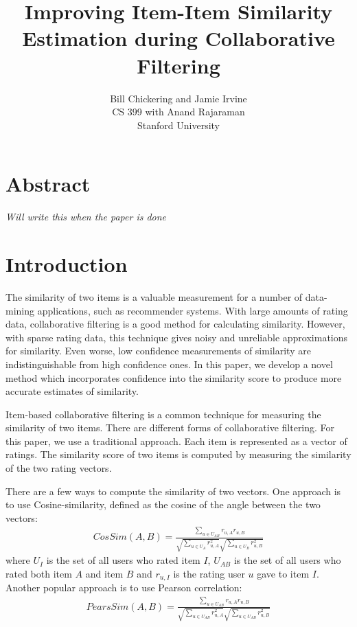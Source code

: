 \documentclass[11pt]{article}
\begin{document}

\title{Improving Item-Item Similarity Estimation during Collaborative Filtering}
\author{Bill Chickering and Jamie Irvine\\
CS 399 with Anand Rajaraman\\
Stanford University}
\renewcommand{\today}{March 25, 2014}
\maketitle

\section*{Abstract}
\emph{Will write this when the paper is done}

\section*{Introduction}
The similarity of two items is a valuable measurement for a number of
data-mining applications, such as recommender systems. With large amounts of
rating data, collaborative filtering is a good method for calculating
similarity. However, with sparse rating data, this technique gives noisy and
unreliable approximations for similarity. Even worse, low confidence
measurements of similarity are indistinguishable from high confidence ones. In
this paper, we develop a novel method which incorporates confidence into the
similarity score to produce more accurate estimates of similarity.
 
Item-based collaborative filtering is a common technique for measuring the
similarity of two items. There are different forms of collaborative filtering.
For this paper, we use a traditional approach. Each item is represented as a
vector of ratings. The similarity score of two items is computed by measuring
the similarity of the two rating vectors.

There are a few ways to compute the similarity of two vectors. One approach is
to use Cosine-similarity, defined as the cosine of the angle between the two
vectors:
\begin{align}
CosSim(A, B) = \frac{\sum\limits_{u\in U_{AB}}
r_{u,A}r_{u,B}}{\sqrt{\sum\limits_{u\in U_{A}} r_{u,A}^2}
\sqrt{\sum\limits_{u\in U_{B}} r_{u,B}^2}}
\end{align}
where $U_{I}$ is the set of all users who rated item $I$, $U_{AB}$ is the set of
all users who rated both item $A$ and item $B$ and $r_{u,I}$ is the rating user
$u$ gave to item $I$. Another popular approach is to use Pearson correlation:
\begin{align}
PearsSim(A, B) = \frac{\sum\limits_{u\in U_{AB}}
r_{u,A}r_{u,B}}{\sqrt{\sum\limits_{u\in U_{AB}} r_{u,A}^2}
\sqrt{\sum\limits_{u\in U_{AB}} r_{u,B}^2}}
\end{align}
\end{document}
